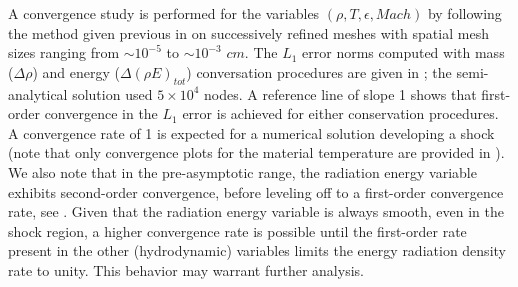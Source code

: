 \documentclass[times,doublespace]{fldauth}%
\begin{document}
A convergence study is performed for the variables $(\rho, T, \epsilon, Mach)$ by following the method given previous in  on successively refined meshes with spatial mesh sizes ranging from $\sim 10^{-5}$ to $\sim 10^{-3}$ $cm$. The $L_1$ error norms computed with mass ($\Delta \rho$) and energy ($\Delta (\rho E)_{tot}$) conversation procedures are given in ; the semi-analytical solution used $5 \times 10^4$ nodes. A reference line of slope 1 shows that first-order convergence in the $L_1$ error is achieved for either conservation procedures. A convergence rate of 1 is expected for a numerical solution developing a shock \cite{lowrie-2009} 
(note that only convergence plots for the material temperature are provided in \cite{lowrie-2009}). 
We also note that in the pre-asymptotic range, the radiation energy variable exhibits second-order convergence, before leveling off
to a first-order convergence rate, see .  
Given that the radiation energy variable is always smooth, even in the shock region, a higher convergence rate is possible
until the first-order rate present in the other (hydrodynamic) variables limits the energy radiation density rate to unity.
This behavior may warrant further analysis. 
%
\end{document}
